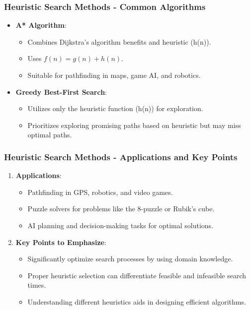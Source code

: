 \documentclass[aspectratio=169]{beamer}
\begin{document}
\begin{frame}[fragile]
    \frametitle{Heuristic Search Methods - Common Algorithms}
    \begin{itemize}
        \item \textbf{A* Algorithm}:
            \begin{itemize}
                \item Combines Dijkstra's algorithm benefits and heuristic (h(n)).
                \item Uses \( f(n) = g(n) + h(n) \).
                \item Suitable for pathfinding in maps, game AI, and robotics.
            \end{itemize}

        \item \textbf{Greedy Best-First Search}:
            \begin{itemize}
                \item Utilizes only the heuristic function (h(n)) for exploration.
                \item Prioritizes exploring promising paths based on heuristic but may miss optimal paths.
            \end{itemize}
    \end{itemize}
\end{frame}

\begin{frame}[fragile]
    \frametitle{Heuristic Search Methods - Applications and Key Points}
    \begin{enumerate}
        \item \textbf{Applications}:
            \begin{itemize}
                \item Pathfinding in GPS, robotics, and video games.
                \item Puzzle solvers for problems like the 8-puzzle or Rubik’s cube.
                \item AI planning and decision-making tasks for optimal solutions.
            \end{itemize}

        \item \textbf{Key Points to Emphasize}:
            \begin{itemize}
                \item Significantly optimize search processes by using domain knowledge.
                \item Proper heuristic selection can differentiate feasible and infeasible search times.
                \item Understanding different heuristics aids in designing efficient algorithms.
            \end{itemize}
    \end{enumerate}
\end{frame}
\end{document}
